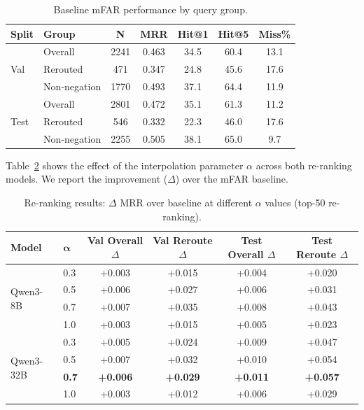 \begin{table}[h]
\centering
\caption{Baseline mFAR performance by query group.}
\label{tab:baseline}
\begin{tabular}{llccccc}
\toprule
\textbf{Split} & \textbf{Group} & \textbf{N} & \textbf{MRR} & \textbf{Hit@1} & \textbf{Hit@5} & \textbf{Miss\%} \\
\midrule
\multirow{3}{*}{Val}
 & Overall        & 2241 & 0.463 & 34.5 & 60.4 & 13.1 \\
 & Rerouted       &  471 & 0.347 & 24.8 & 45.6 & 17.6 \\
 & Non-negation   & 1770 & 0.493 & 37.1 & 64.4 & 11.9 \\
\midrule
\multirow{3}{*}{Test}
 & Overall        & 2801 & 0.472 & 35.1 & 61.3 & 11.2 \\
 & Rerouted       &  546 & 0.332 & 22.3 & 46.0 & 17.6 \\
 & Non-negation   & 2255 & 0.505 & 38.1 & 65.0 &  9.7 \\
\bottomrule
\end{tabular}
\end{table}

Table~\ref{tab:alpha_sweep} shows the effect of the interpolation parameter $\alpha$ across both re-ranking models. We report the improvement ($\Delta$) over the mFAR baseline.

\begin{table}[h]
\centering
\caption{Re-ranking results: $\Delta$ MRR over baseline at different $\alpha$ values (top-50 re-ranking).}
\label{tab:alpha_sweep}
\begin{tabular}{llcccc}
\toprule
\textbf{Model} & $\boldsymbol{\alpha}$ & \textbf{Val Overall $\Delta$} & \textbf{Val Reroute $\Delta$} & \textbf{Test Overall $\Delta$} & \textbf{Test Reroute $\Delta$} \\
\midrule
\multirow{4}{*}{Qwen3-8B}
 & 0.3 & +0.003 & +0.015 & +0.004 & +0.020 \\
 & 0.5 & +0.006 & +0.027 & +0.006 & +0.031 \\
 & 0.7 & +0.007 & +0.035 & +0.008 & +0.043 \\
 & 1.0 & +0.003 & +0.015 & +0.005 & +0.023 \\
\midrule
\multirow{4}{*}{Qwen3-32B}
 & 0.3 & +0.005 & +0.024 & +0.009 & +0.047 \\
 & 0.5 & +0.007 & +0.032 & +0.010 & +0.054 \\
 & \textbf{0.7} & \textbf{+0.006} & \textbf{+0.029} & \textbf{+0.011} & \textbf{+0.057} \\
 & 1.0 & +0.003 & +0.012 & +0.006 & +0.029 \\
\bottomrule
\end{tabular}
\end{table}

